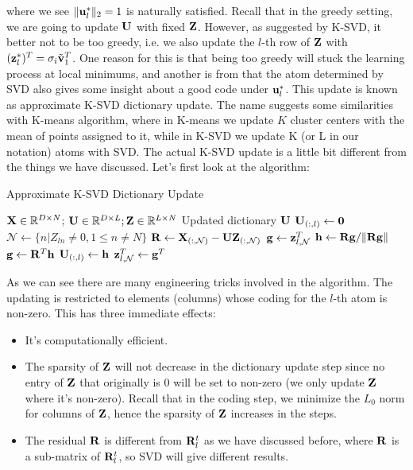 \documentclass[../book-template.tex]{subfiles}
\begin{document}
where we see $\|{\bf u}_l^*\|_2=1$ is naturally satisfied. Recall that in the greedy setting, we are going to update ${\bf U}$ with fixed ${\bf Z}$. However, as suggested by K-SVD, it better not to be too greedy, i.e. we also update the $l$-th row of ${\bf Z}$ with $({\bf z}_l^{*})^T = \sigma_i\tilde{\bf v}_1^T$. One reason for this is that being too greedy will stuck the learning process at local minimums, and another is from that the atom determined by SVD also gives some insight about a good code under ${\bf u}_l^*$. This update is known as approximate K-SVD dictionary update. The name suggests some similarities with K-means algorithm, where in K-means we update $K$ cluster centers with the mean of points assigned to it, while in K-SVD we update K (or L in our notation) atoms with SVD. The actual K-SVD update is a little bit different from the things we have discussed. Let's first look at the algorithm:
\begin{algorithm}
	\caption{Approximate K-SVD Dictionary Update}
	\begin{algorithmic}[1]
		\Require ${\bf X}\in \mathbb{R}^{D\times N}$; ${\bf U}\in \mathbb{R}^{D\times L}; {\bf Z}\in \mathbb{R}^{L\times N}$
		\Ensure Updated dictionary ${\bf U}$
			\State ${\bf U}_{(:,l)}\leftarrow {\bf 0}$ 
			\State $\mathcal{N}\leftarrow\{n|Z_{ln}\neq0,1\leq n\neq N\}$ 
			\State ${\bf R}\leftarrow{\bf X}_{(:,\mathcal{N})}-{\bf UZ}_{(:,\mathcal{N})}$	
			\State ${\bf g}\leftarrow {\bf z}^T_{l,\mathcal{N}}$
			\State ${\bf h}\leftarrow {\bf Rg}/\|{\bf Rg}\|$ 
			\State ${\bf g}\leftarrow {\bf R}^T{\bf h}$	
			\State ${\bf U}_{(:,l)}\leftarrow {\bf h}$ 
			\State ${\bf z}^T_{l,\mathcal{N}}\leftarrow {\bf g}^T$ 
		\EndFor
	\end{algorithmic}
\end{algorithm}
\par As we can see there are many engineering tricks involved in the algorithm. The updating is restricted to elements (columns) whose coding for the $l$-th atom is non-zero. This has three immediate effects: 
\begin{itemize}
	\item It's computationally efficient.
	\item The sparsity of ${\bf Z}$ will not decrease in the dictionary update step since no entry of ${\bf Z}$ that originally is $0$ will be set to non-zero (we only update ${\bf Z}$ where it's non-zero). Recall that in the coding step, we minimize the $L_0$ norm for columns of ${\bf Z}$, hence the sparsity of ${\bf Z}$ increases in the steps.
	\item The residual ${\bf R}$ is different from ${\bf R}_l^t$ as we have discussed before, where ${\bf R}$ is a sub-matrix of ${\bf R}_l^t$, so SVD will give different results.
\end{itemize} 
\end{document}
